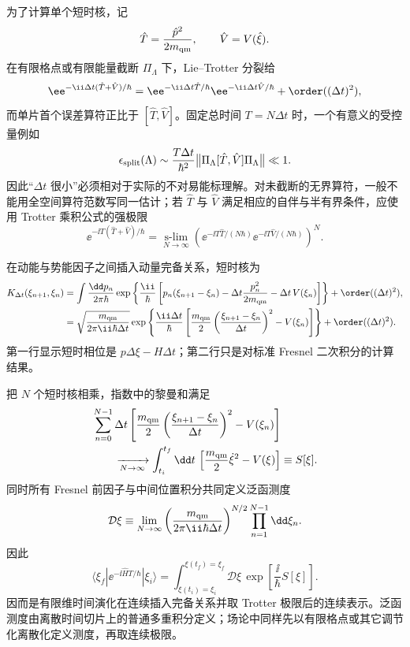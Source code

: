 为了计算单个短时核，记
\[
\hat T=\frac{\hat p^2}{2m_{\rm qm}},\qquad \hat V=V(\hat\xi).
\]
在有限格点或有限能量截断 $\Pi_\Lambda$ 下，Lie--Trotter 分裂给
\begin{equation}
 \ee^{-\ii\Delta t(\hat T+\hat V)/\hbar}
 =\ee^{-\ii\Delta t\hat T/\hbar}
  \ee^{-\ii\Delta t\hat V/\hbar}
 +\order((\Delta t)^2),
 \label{eq:trotter-short-r15}
\end{equation}
而单片首个误差算符正比于 $[\hat T,\hat V]$。固定总时间 $T=N\Delta t$ 时，一个有意义的受控量例如
\begin{equation}
 \epsilon_{\rm split}(\Lambda)
 \sim\frac{T\Delta t}{\hbar^2}
 \bigl\|\Pi_\Lambda[\hat T,\hat V]\Pi_\Lambda\bigr\|\ll1.
 \label{eq:trotter-control-regulated-dp73}
\end{equation}
因此“$\Delta t$ 很小”必须相对于实际的不对易能标理解。对未截断的无界算符，一般不能用全空间算符范数写同一估计；若 $\hat T$ 与 $\hat V$ 满足相应的自伴与半有界条件，应使用 Trotter 乘积公式的强极限
\[
 \ee^{-\ii T(\hat T+\hat V)/\hbar}
 =\operatorname*{s-lim}_{N\to\infty}
 \left(\ee^{-\ii T\hat T/(N\hbar)}\ee^{-\ii T\hat V/(N\hbar)}\right)^N.
\]

在动能与势能因子之间插入动量完备关系，短时核为
\begin{align}
 K_{\Delta t}(\xi_{n+1},\xi_n)
 &=\int\frac{\dd p_n}{2\pi\hbar}
 \exp\left\{\frac{\ii}{\hbar}
 \left[p_n(\xi_{n+1}-\xi_n)
 -\Delta t\frac{p_n^2}{2m_{\rm qm}}
 -\Delta t\,V(\xi_n)\right]\right\}
 +\order((\Delta t)^2),
 \label{eq:short-kernel-momentum-r15}\\
 &=\sqrt{\frac{m_{\rm qm}}{2\pi\ii\hbar\Delta t}}
 \exp\left\{\frac{\ii\Delta t}{\hbar}
 \left[
 \frac{m_{\rm qm}}{2}
 \left(\frac{\xi_{n+1}-\xi_n}{\Delta t}\right)^2
 -V(\xi_n)
 \right]\right\}
 +\order((\Delta t)^2).
 \label{eq:short-kernel-config-r15}
\end{align}
第一行显示短时相位是 $p\Delta\xi-H\Delta t$；第二行只是对标准 Fresnel 二次积分的计算结果。

把 $N$ 个短时核相乘，指数中的黎曼和满足
\begin{align}
 &\sum_{n=0}^{N-1}\Delta t
 \left[
 \frac{m_{\rm qm}}{2}
 \left(\frac{\xi_{n+1}-\xi_n}{\Delta t}\right)^2
 -V(\xi_n)
 \right]\\
 &\qquad\xrightarrow[N\to\infty]{}
 \int_{t_i}^{t_f}\dd t\,
 \left[\frac{m_{\rm qm}}{2}\dot\xi^2-V(\xi)\right]
 \equiv S[\xi].
 \label{eq:lattice-action-limit-r15}
\end{align}
同时所有 Fresnel 前因子与中间位置积分共同定义泛函测度
\begin{equation*}
 \mathcal D\xi\equiv
 \lim_{N\to\infty}
 \left(\frac{m_{\rm qm}}{2\pi\ii\hbar\Delta t}\right)^{N/2}
 \prod_{n=1}^{N-1}\dd \xi_n.
\end{equation*}
因此
\begin{equation}
 \boxed{
 \langle \xi_f|\ee^{-\ii\hat H T/\hbar}|\xi_i\rangle
 =\int_{\xi(t_i)=\xi_i}^{\xi(t_f)=\xi_f}\mathcal D\xi\,
 \exp\left[\frac{\ii}{\hbar}S[\xi]\right].}
 \label{eq:qm-path-integral-r15}
\end{equation}
 因而是有限维时间演化在连续插入完备关系并取 Trotter 极限后的连续表示。泛函测度由离散时间切片上的普通多重积分定义；场论中同样先以有限格点或其它调节化离散化定义测度，再取连续极限。

